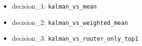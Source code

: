 \begin{itemize}
\item decision_1: \texttt{kalman_vs_mean}
\item decision_2: \texttt{kalman_vs_weighted_mean}
\item decision_3: \texttt{kalman_vs_router_only_top1}
\end{itemize}
